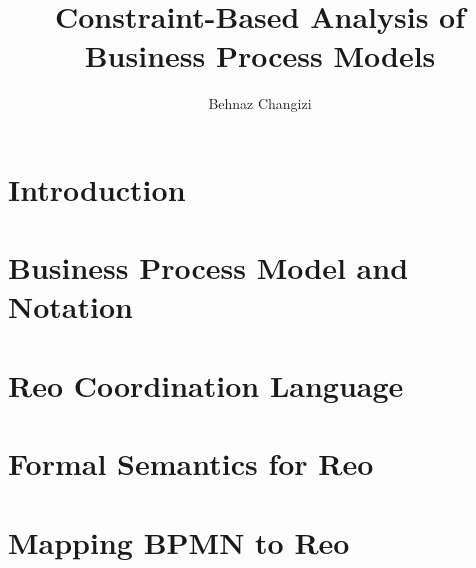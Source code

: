 \documentclass[runnngheads]{book}
\author{Behnaz Changizi}
\renewcommand{\maketitle}
{
	\singlespacing
	\thispagestyle{empty}
	\vspace*{\fill} \vspace{150pt} \begin{center}
		\Huge \textcolor{black} \thetitle \normalsize 
	
	\sc \vspace{100pt}
	Behnaz Changizi %
%	
%	
%	
%	
	\end{center}
	\vspace*{\fill}
}
\begin{document}
%
\pagestyle{empty}
\title{Constraint-Based Analysis of Business Process Models}


\thispagestyle{empty}
\frontmatter
\tableofcontents



\newsavebox\behbox
\begin{lrbox}{\behbox}
\end{lrbox}

\pagestyle{empty}

\thispagestyle{empty}
\lstlistoflistings
\clearpage

\thispagestyle{empty}
\pagestyle{empty}
\listoffigures 
\clearpage


\listoftables

\onehalfspacing

\pagestyle{plain}
\clearpage

\mainmatter
\chapter{Introduction}

\chapter{Business Process Model and Notation}
\label{ch:bpmn}

\chapter{Reo Coordination Language}
\label{ch:reo}

\chapter{Formal Semantics for Reo}
\label{ch:formsem}


\chapter{Mapping BPMN to Reo}
\label{ch:mapping}

\end{document}
